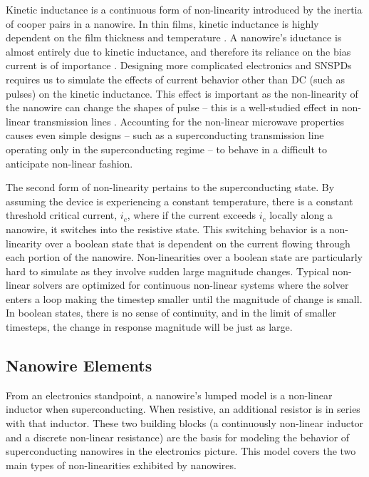 Kinetic inductance is a continuous form of non-linearity introduced by the inertia of cooper
pairs in a nanowire. In thin films, kinetic inductance is highly dependent on the film thickness
and temperature \cite{dizhu-thesis}. 
A nanowire's iductance is almost entirely due to kinetic inductance, and therefore
its reliance on the bias current is of importance \cite{kinetic_inductance_majority_of_nw}.
Designing more complicated electronics and SNSPDs  requires
us to simulate the effects of current behavior other than DC (such as pulses)
on the kinetic inductance. This effect is important as 
the non-linearity of the nanowire can change the shapes of pulse -- this is a well-studied effect in non-linear transmission lines \cite{nl_tline_reshape}. 
Accounting for the non-linear microwave properties causes even simple designs 
-- such as a superconducting transmission line operating only in the superconducting regime -- to 
behave in a difficult to anticipate non-linear fashion. 

The second form of non-linearity pertains to the superconducting state. By assuming the device is
experiencing a constant temperature, there is a constant threshold critical current,
$i_c$, where if the current exceeds $i_c$ locally along a nanowire, it switches into the resistive state. This switching behavior is a non-linearity
over a boolean state that is dependent on the current flowing through each portion of the nanowire.
Non-linearities over a boolean state are particularly hard to simulate as they involve sudden large
magnitude changes. Typical non-linear solvers are optimized for continuous non-linear systems where
the solver enters a loop making the timestep smaller until the magnitude of change is small.
In boolean states, there is no sense of continuity, and in the limit of smaller timesteps, the 
change in response magnitude will be just as large. 

\subsection{Nanowire Elements}

From an electronics standpoint, a nanowire's lumped model is a non-linear inductor when superconducting. When resistive, an additional resistor is in series with that inductor.
These two building blocks (a continuously non-linear inductor and a discrete non-linear
resistance) are the basis for modeling the behavior of superconducting nanowires in
the electronics picture. This model covers the two main types of non-linearities
exhibited by nanowires.

